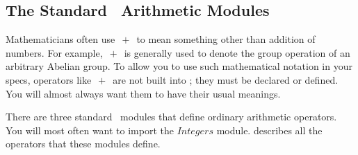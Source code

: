 \documentclass[fleqn,leqno]{article}
\begin{document}
  \vspace{-2\baselineskip}
\subsection*{The Standard \protect\tlaplus\ Arithmetic Modules}

Mathematicians often use $\,+\,$ to mean something other than addition
of numbers.  For example, $\,+\,$ is generally used to denote the
group operation of an arbitrary Abelian group.  To allow you to use
such mathematical notation in your specs, operators like $\,+\,$ are
not built into \tlaplus; they must be declared or defined.  You will
almost always want them to have their usual meanings.

\vspace{.5\baselineskip}\noindent
There are three standard \tlaplus\ modules that define ordinary
arithmetic operators.  You will most often want to import the
$Integers$ module.  
describes all the operators that these modules define.
\end{document}
